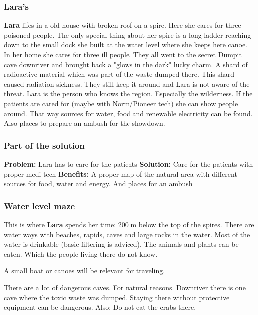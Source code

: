 \subsubsection{Lara's}

\textbf{Lara} lifes in a old house with broken roof on a spire. Here she cares for three poisoned people. The only special thing about her spire is a long ladder reaching down to the small dock she built at the water level where she keeps here canoe.
In her home she cares for three ill people. They all went to the secret Dumpit cave downriver and brought back a "glows in the dark" lucky charm. A shard of radioactive material which was part of the waste dumped there. This shard caused radiation sickness. They still keep it around and Lara is not aware of the threat.
Lara is the person who knows the region. Especially the wilderness. If the patients are cared for (maybe with Norm/Pioneer tech) she can show people around. That way sources for water, food and renewable electricity can be found. Also places to prepare an ambush for the showdown.

\subsubsection{Part of the solution}

\textbf{Problem:} Lara has to care for the patients
\textbf{Solution:} Care for the patients with proper medi tech
\textbf{Benefits:} A proper map of the natural area with different sources for food, water and energy. And places for an ambush

\subsubsection{Water level maze}

This is where \textbf{Lara} spends her time: 200 m below the top of the spires. There are water ways with beaches, rapids, caves and large rocks in the water. Most of the water is drinkable (basic filtering is adviced). The animals and plants can be eaten. Which the people living there do not know.

A small boat or canoes will be relevant for traveling.

There are a lot of dangerous caves. For natural reasons. Downriver there is one cave where the toxic waste was dumped. Staying there without protective equipment can be dangerous. Also: Do not eat the crabs there.


